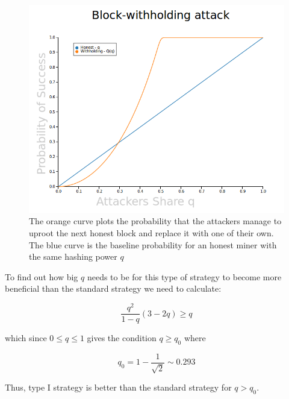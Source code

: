 \documentclass[letterpaper,12pt]{report}
\theoremstyle{plain}
\theoremstyle{definition}
\begin{document}
\begin{figure}[pos]
\centering
\includegraphics[width=150mm]{Blockwithholdingattack.png}
\caption{The orange curve plots the probability that the attackers manage to uproot the next honest block and replace it with one of their own. The blue curve is the baseline probability for an honest miner with the same hashing power $q$}
\label{fig:PlotProbOfSuccess}
\end{figure}

To find out how big $q$ needs to be for this type of strategy to become more beneficial than the standard strategy we need to calculate:

\begin{equation}\label{eqn:type1overstandard}
\dfrac{q^2}{1-q}\left(3-2q\right) \geq q
\end{equation}

which since $0\leq q \leq 1$ gives the condition $q \geq q_0$ where 

\begin{equation}\label{eqn:qnot}
q_0=1-\frac{1}{\sqrt{2}} \sim 0.293
\end{equation}

Thus, type I strategy is better than the standard strategy for $q>q_0$.
\end{document}
